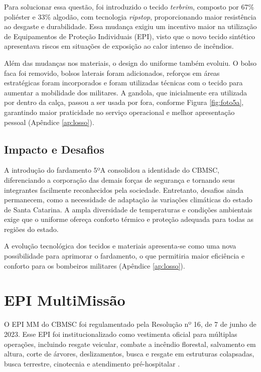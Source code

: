Para solucionar essa questão, foi introduzido o tecido \textit{terbrim}, composto por 67\% poliéster
 e 33\% algodão, com tecnologia \textit{ripstop}, proporcionando maior resistência ao desgaste 
 e durabilidade. Essa mudança exigiu um incentivo maior na utilização de 
 Equipamentos de Proteção Individuais (\acrshort{EPI}), visto que o novo tecido sintético apresentava riscos em situações de exposição 
 ao calor intenso de incêndios.

Além das mudanças nos materiais, o design do uniforme também evoluiu. O bolso faca foi removido, 
bolsos laterais foram adicionados, reforços em áreas estratégicas foram incorporados e foram utilizadas
técnicas com o tecido para aumentar a mobilidade dos militares. A gandola, que inicialmente 
era utilizada por dentro da calça, passou a ser usada por fora, conforme Figura \ref{fig:foto5a}, garantindo maior praticidade no 
serviço operacional e melhor apresentação pessoal (Apêndice \ref{ap:losso}).


\subsection{Impacto e Desafios}

A introdução do fardamento 5ºA consolidou a identidade do \acrshort{CBMSC}, diferenciando a corporação das 
demais forças de segurança e tornando seus integrantes facilmente reconhecidos pela sociedade. 
Entretanto, desafios ainda permanecem, como a necessidade de adaptação às variações climáticas 
do estado de Santa Catarina. A ampla diversidade de temperaturas e condições ambientais exige 
que o uniforme ofereça conforto térmico e proteção adequada para todas as regiões do estado.

A evolução tecnológica dos tecidos e materiais apresenta-se como uma nova possibilidade
 para aprimorar o fardamento, o que permitiria maior eficiência e conforto para os bombeiros 
 militares (Apêndice \ref{ap:losso}). 


\section{EPI MultiMissão}

O \acrshort{EPI} \acrfull{MM} do \acrshort{CBMSC} foi regulamentado pela Resolução nº 16, de 7 de junho de 2023. Esse \acrlong{EPI} foi institucionalizado como 
vestimenta oficial para múltiplas operações, incluindo resgate veicular, combate a incêndio 
florestal, salvamento em altura, corte de árvores, deslizamentos, busca e resgate em 
estruturas colapsadas, busca terrestre, cinotecnia e atendimento pré-hospitalar \cite{res16}.

